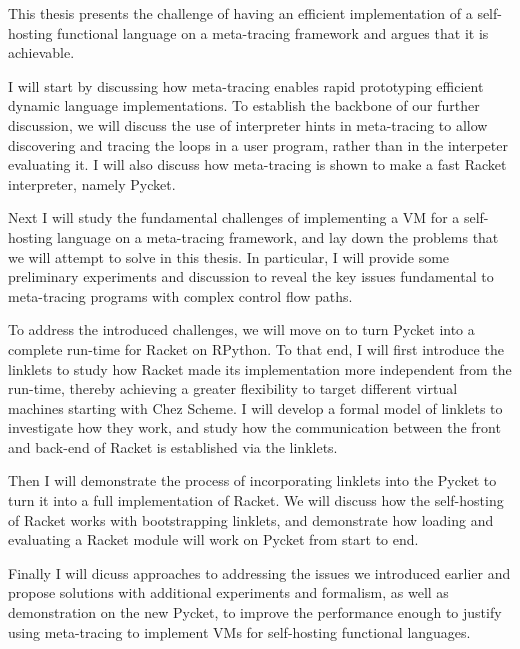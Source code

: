 This thesis presents the challenge of having an efficient
implementation of a self-hosting functional language on a meta-tracing
framework and argues that it is achievable.

I will start by discussing how meta-tracing enables rapid prototyping
efficient dynamic language implementations. To establish the backbone
of our further discussion, we will discuss the use of interpreter
hints in meta-tracing to allow discovering and tracing the loops in a
user program, rather than in the interpeter evaluating it. I will also
discuss how meta-tracing is shown to make a fast Racket interpreter,
namely Pycket.

Next I will study the fundamental challenges of implementing a VM for
a self-hosting language on a meta-tracing framework, and lay down the
problems that we will attempt to solve in this thesis. In particular,
I will provide some preliminary experiments and discussion to reveal
the key issues fundamental to meta-tracing programs with complex
control flow paths.

To address the introduced challenges, we will move on to turn Pycket
into a complete run-time for Racket on RPython. To that end, I will
first introduce the linklets to study how Racket made its
implementation more independent from the run-time, thereby achieving a
greater flexibility to target different virtual machines starting with
Chez Scheme. I will develop a formal model of linklets to investigate
how they work, and study how the communication between the front and
back-end of Racket is established via the linklets.

Then I will demonstrate the process of incorporating linklets into the
Pycket to turn it into a full implementation of Racket. We will
discuss how the self-hosting of Racket works with bootstrapping
linklets, and demonstrate how loading and evaluating a Racket module
will work on Pycket from start to end.

Finally I will dicuss approaches to addressing the issues we
introduced earlier and propose solutions with additional experiments
and formalism, as well as demonstration on the new Pycket, to improve
the performance enough to justify using meta-tracing to implement VMs
for self-hosting functional languages.

